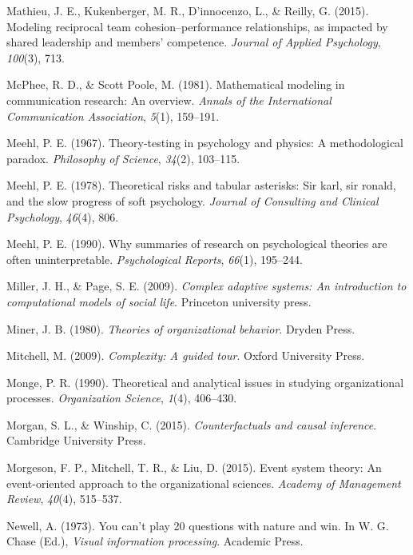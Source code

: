\documentclass[english,man]{apa6}
\theoremstyle{definition}
\theoremstyle{definition}
\theoremstyle{definition}
\theoremstyle{remark}
\begin{document}
\hypertarget{ref-mathieu2015}{}
Mathieu, J. E., Kukenberger, M. R., D'innocenzo, L., \& Reilly, G.
(2015). Modeling reciprocal team cohesion--performance relationships, as
impacted by shared leadership and members' competence. \emph{Journal of
Applied Psychology}, \emph{100}(3), 713.

\hypertarget{ref-mcphee1981}{}
McPhee, R. D., \& Scott Poole, M. (1981). Mathematical modeling in
communication research: An overview. \emph{Annals of the International
Communication Association}, \emph{5}(1), 159--191.

\hypertarget{ref-meehl1967}{}
Meehl, P. E. (1967). Theory-testing in psychology and physics: A
methodological paradox. \emph{Philosophy of Science}, \emph{34}(2),
103--115.

\hypertarget{ref-meehl1978}{}
Meehl, P. E. (1978). Theoretical risks and tabular asterisks: Sir karl,
sir ronald, and the slow progress of soft psychology. \emph{Journal of
Consulting and Clinical Psychology}, \emph{46}(4), 806.

\hypertarget{ref-Meehl1990}{}
Meehl, P. E. (1990). Why summaries of research on psychological theories
are often uninterpretable. \emph{Psychological Reports}, \emph{66}(1),
195--244.

\hypertarget{ref-miller2009}{}
Miller, J. H., \& Page, S. E. (2009). \emph{Complex adaptive systems: An
introduction to computational models of social life}. Princeton
university press.

\hypertarget{ref-miner1980}{}
Miner, J. B. (1980). \emph{Theories of organizational behavior}. Dryden
Press.

\hypertarget{ref-mitchell2009}{}
Mitchell, M. (2009). \emph{Complexity: A guided tour}. Oxford University
Press.

\hypertarget{ref-monge1990}{}
Monge, P. R. (1990). Theoretical and analytical issues in studying
organizational processes. \emph{Organization Science}, \emph{1}(4),
406--430.

\hypertarget{ref-morgan2015}{}
Morgan, S. L., \& Winship, C. (2015). \emph{Counterfactuals and causal
inference}. Cambridge University Press.

\hypertarget{ref-morgeson2015}{}
Morgeson, F. P., Mitchell, T. R., \& Liu, D. (2015). Event system
theory: An event-oriented approach to the organizational sciences.
\emph{Academy of Management Review}, \emph{40}(4), 515--537.

\hypertarget{ref-newell1973}{}
Newell, A. (1973). You can't play 20 questions with nature and win. In
W. G. Chase (Ed.), \emph{Visual information processing}. Academic Press.
\end{document}

